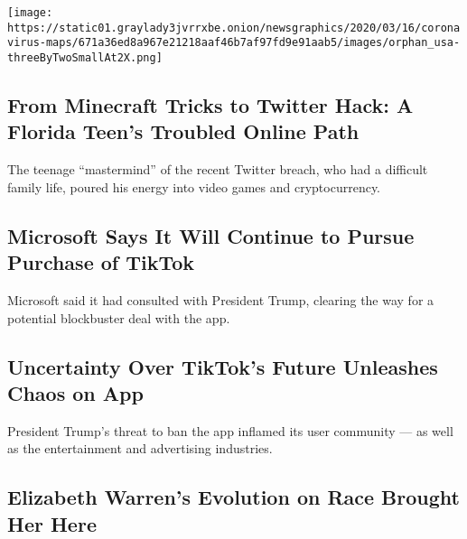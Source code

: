 \texttt{[image: https://static01.graylady3jvrrxbe.onion/newsgraphics/2020/03/16/coronavirus-maps/671a36ed8a967e21218aaf46b7af97fd9e91aab5/images/orphan\_usa-threeByTwoSmallAt2X.png]}

\href{/2020/08/02/technology/florida-teenager-twitter-hack.html}{}

\hypertarget{from-minecraft-tricks-to-twitter-hack-a-florida-teens-troubled-online-path}{%
\subsection{From Minecraft Tricks to Twitter Hack: A Florida Teen's
Troubled Online
Path}\label{from-minecraft-tricks-to-twitter-hack-a-florida-teens-troubled-online-path}}

The teenage ``mastermind'' of the recent Twitter breach, who had a
difficult family life, poured his energy into video games and
cryptocurrency.

\href{/2020/08/02/business/economy/trump-tiktok-china-national-security.html}{}

\hypertarget{microsoft-says-it-will-continue-to-pursue-purchase-of-tiktok}{%
\subsection{Microsoft Says It Will Continue to Pursue Purchase of
TikTok}\label{microsoft-says-it-will-continue-to-pursue-purchase-of-tiktok}}

Microsoft said it had consulted with President Trump, clearing the way
for a potential blockbuster deal with the app.

\href{/2020/08/02/style/tiktok-ban-threat-trump.html}{}

\hypertarget{uncertainty-over-tiktoks-future-unleashes-chaos-on-app}{%
\subsection{Uncertainty Over TikTok's Future Unleashes Chaos on
App}\label{uncertainty-over-tiktoks-future-unleashes-chaos-on-app}}

President Trump's threat to ban the app inflamed its user community ---
as well as the entertainment and advertising industries.

\href{/2020/08/02/us/politics/elizabeth-warren-biden-vice-president.html}{}

\hypertarget{elizabeth-warrens-evolution-on-race-brought-her-here}{%
\subsection{Elizabeth Warren's Evolution on Race Brought Her
Here}\label{elizabeth-warrens-evolution-on-race-brought-her-here}}

